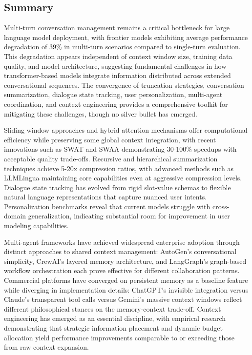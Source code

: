\subsection{Summary}

Multi-turn conversation management remains a critical bottleneck for large language model deployment, with frontier models exhibiting average performance degradation of 39\% in multi-turn scenarios compared to single-turn evaluation. This degradation appears independent of context window size, training data quality, and model architecture, suggesting fundamental challenges in how transformer-based models integrate information distributed across extended conversational sequences. The convergence of truncation strategies, conversation summarization, dialogue state tracking, user personalization, multi-agent coordination, and context engineering provides a comprehensive toolkit for mitigating these challenges, though no silver bullet has emerged.

Sliding window approaches and hybrid attention mechanisms offer computational efficiency while preserving some global context integration, with recent innovations such as SWAT and SWAA demonstrating 30-100\% speedups with acceptable quality trade-offs. Recursive and hierarchical summarization techniques achieve 5-20x compression ratios, with advanced methods such as LLMLingua maintaining core capabilities even at aggressive compression levels. Dialogue state tracking has evolved from rigid slot-value schemas to flexible natural language representations that capture nuanced user intents. Personalization benchmarks reveal that current models struggle with cross-domain generalization, indicating substantial room for improvement in user modeling capabilities.

Multi-agent frameworks have achieved widespread enterprise adoption through distinct approaches to shared context management: AutoGen's conversational simplicity, CrewAI's layered memory architecture, and LangGraph's graph-based workflow orchestration each prove effective for different collaboration patterns. Commercial platforms have converged on persistent memory as a baseline feature while diverging in implementation details: ChatGPT's invisible integration versus Claude's transparent tool calls versus Gemini's massive context windows reflect different philosophical stances on the memory-context trade-off. Context engineering has emerged as an essential discipline, with empirical research demonstrating that strategic information placement and dynamic budget allocation yield performance improvements comparable to or exceeding those from raw context expansion.

